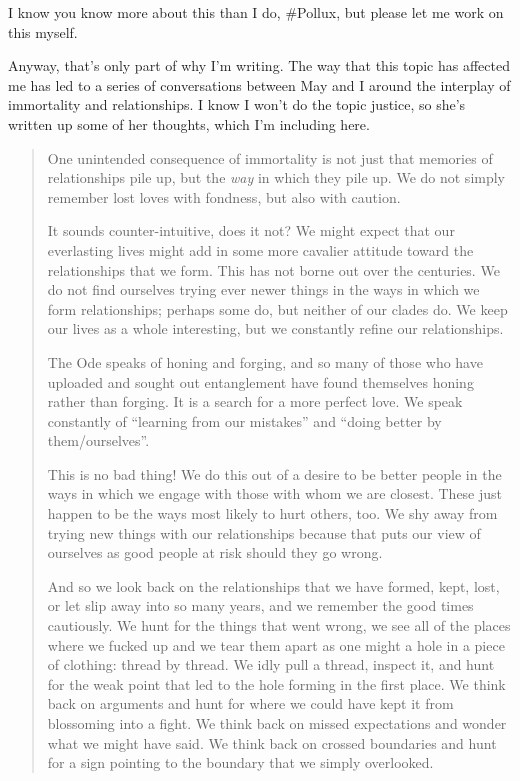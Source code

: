 I know you know more about this than I do, \#Pollux, but please let me work on this myself.

Anyway, that's only part of why I'm writing. The way that this topic has affected me has led to a series of conversations between May and I around the interplay of immortality and relationships. I know I won't do the topic justice, so she's written up some of her thoughts, which I'm including here.

\begin{quote}
One unintended consequence of immortality is not just that memories of relationships pile up, but the \emph{way} in which they pile up. We do not simply remember lost loves with fondness, but also with caution.

It sounds counter-intuitive, does it not? We might expect that our everlasting lives might add in some more cavalier attitude toward the relationships that we form. This has not borne out over the centuries. We do not find ourselves trying ever newer things in the ways in which we form relationships; perhaps some do, but neither of our clades do. We keep our lives as a whole interesting, but we constantly refine our relationships.

The Ode speaks of honing and forging, and so many of those who have uploaded and sought out entanglement have found themselves honing rather than forging. It is a search for a more perfect love. We speak constantly of ``learning from our mistakes'' and ``doing better by them/ourselves''.

This is no bad thing! We do this out of a desire to be better people in the ways in which we engage with those with whom we are closest. These just happen to be the ways most likely to hurt others, too. We shy away from trying new things with our relationships because that puts our view of ourselves as good people at risk should they go wrong.

And so we look back on the relationships that we have formed, kept, lost, or let slip away into so many years, and we remember the good times cautiously. We hunt for the things that went wrong, we see all of the places where we fucked up and we tear them apart as one might a hole in a piece of clothing: thread by thread. We idly pull a thread, inspect it, and hunt for the weak point that led to the hole forming in the first place. We think back on arguments and hunt for where we could have kept it from blossoming into a fight. We think back on missed expectations and wonder what we might have said. We think back on crossed boundaries and hunt for a sign pointing to the boundary that we simply overlooked.


\end{quote}
